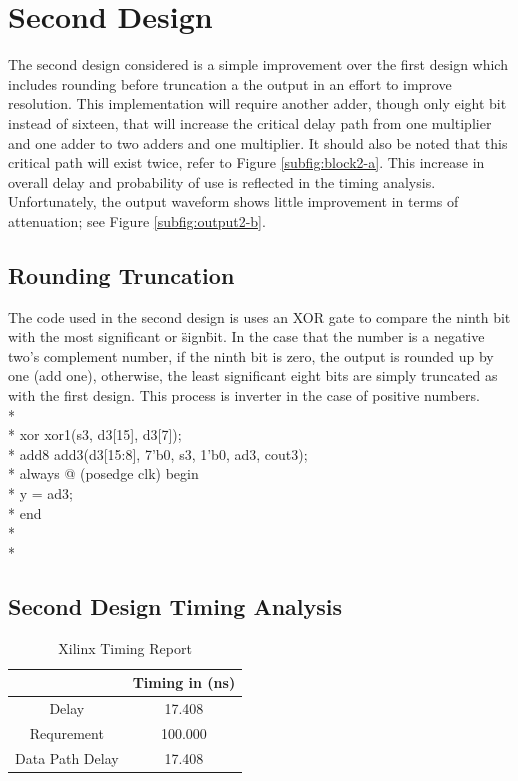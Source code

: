 \section*{Second Design}
The second design considered is a simple improvement over the first design which includes rounding before truncation a the output in an effort to improve resolution. This implementation will require another adder, though only eight bit instead of sixteen, that will increase the critical delay path from one multiplier and one adder to two adders and one multiplier. It should also be noted that this critical path will exist twice, refer to Figure \ref{subfig:block2-a}. This increase in overall delay and probability of use is reflected in the timing analysis. Unfortunately, the output waveform shows little improvement in terms of attenuation; see Figure \ref{subfig:output2-b}.  

\subsection*{Rounding Truncation}
The code used in the second design is uses an XOR gate to compare the ninth bit with the most significant or \"sign\" bit. In the case that the number is a negative two's complement number, if the ninth bit is zero, the output is rounded up by one (add one), otherwise, the least significant eight bits are simply truncated as with the first design. This process is inverter in the case of positive numbers.  \\*
\\*
xor xor1(s3, d3[15], d3[7]);\\*
add8 add3(d3[15:8], {7'b0, s3}, 1'b0, ad3, cout3);\\*
always @ (posedge clk)
begin\\*
y = ad3;\\*
end\\*
\\*
\subsection*{Second Design Timing Analysis}

\begin{table}[bh]
\caption{Xilinx Timing Report}
\begin{tabular}{c|c}
\centering
           & Timing in (ns) \\
\hline
     Delay &   17.408  \\

Requrement &    100.000    \\

Data Path Delay &  17.408   \\
\end{tabular}  
\label{tab:timing2}
\end{table}

